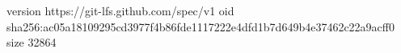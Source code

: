 version https://git-lfs.github.com/spec/v1
oid sha256:ac05a18109295cd3977f4b86fde1117222e4dfd1b7d649b4e37462c22a9acff0
size 32864

